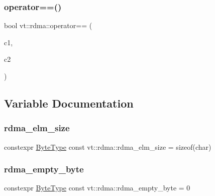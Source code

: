 \subsubsection{\texorpdfstring{operator==()}{operator==()}}
{\footnotesize\ttfamily bool vt\+::rdma\+::operator== (\begin{DoxyParamCaption}\item[{\hyperlink{structvt_1_1rdma_1_1_channel_lookup}{Channel\+Lookup} const \&}]{c1,  }\item[{\hyperlink{structvt_1_1rdma_1_1_channel_lookup}{Channel\+Lookup} const \&}]{c2 }\end{DoxyParamCaption})\hspace{0.3cm}{\ttfamily [inline]}}



\subsection{Variable Documentation}
\mbox{\label{namespacevt_1_1rdma_ad167cbb60749088647bbeee80ded6100}} 
\subsubsection{\texorpdfstring{rdma\+\_\+elm\+\_\+size}{rdma\_elm\_size}}
{\footnotesize\ttfamily constexpr \hyperlink{namespacevt_aab8d55968084610ce3b17057981e9300}{Byte\+Type} const vt\+::rdma\+::rdma\+\_\+elm\+\_\+size = sizeof(char)}

\mbox{\label{namespacevt_1_1rdma_aa4cbaba7c412337495b61a42d3eb134c}} 
\subsubsection{\texorpdfstring{rdma\+\_\+empty\+\_\+byte}{rdma\_empty\_byte}}
{\footnotesize\ttfamily constexpr \hyperlink{namespacevt_aab8d55968084610ce3b17057981e9300}{Byte\+Type} const vt\+::rdma\+::rdma\+\_\+empty\+\_\+byte = 0}

